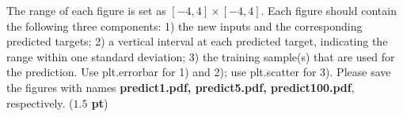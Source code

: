 \documentclass[twoside]{article}
\begin{document}
\begin{enumerate}
     The range of each figure is set as $[-4, 4]\times [-4, 4]$. Each figure should contain the following three components: 1) the new inputs and the corresponding predicted targets; 2) a vertical interval at each predicted target, indicating the range within one standard deviation; 3) the training sample(s) that are used for the prediction. Use \textsf{plt.errorbar} for 1) and 2); use \textsf{plt.scatter} for 3). Please save the figures with names \textbf{predict1.pdf, predict5.pdf, predict100.pdf}, respectively. ({\bf $1.5$ pt})

\end{enumerate}
\end{document}
